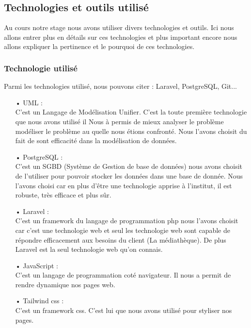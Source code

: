 \documentclass[14pt,a4paper]{article}
\begin{document}
\subsection{Technologies et outils utilisé}
Au cours notre stage nous avons utiliser divers technologies et outils. Ici nous allons 
entrer plus en détails sur ces technologies et plus important encore nous allons 
expliquer la pertinence et le pourquoi de ces technologies.\\
\subsubsection{Technologie utilisé}
Parmi les technologies utilisé, nous pouvons citer : Laravel, PostgreSQL, Git...
\begin{itemize}
\item[•] UML : \\
C'est un Langage de Modélisation Unifier. C'est la toute première technologie que nous avons
utilisé il Nous à permis de mieux analyser le problème modéliser le problème au quelle
nous étions confronté. Nous l'avons choisit du fait de sont efficacité dans la modélisation
de données.
\item[•] PostgreSQL : \\
C'est un SGBD (Système de Gestion de base de données) nous avons choisit de l'utiliser
pour pouvoir stocker les données dans une base de donnée. Nous l'avons choisi car en
plus d'être une technologie apprise à l'institut, il est robuste, très efficace et plus
sûr.
\item[•] Laravel : \\
C'est un framework du langage de programmation php nous l'avons choisit car c'est une
technologie web et seul les technologie web sont capable de répondre efficacement aux besoins du
client (La médiathèque). De plus Laravel est la seul technologie web qu'on connais.
\item[•] JavaScript : \\
C'est un langage de programmation coté navigateur. Il nous a permit de rendre dynamique nos pages
web.
\item[•] Tailwind css : \\
C'est un framework css. C'est lui que nous avons utilisé pour styliser nos pages.
\end{itemize}
\end{document}

